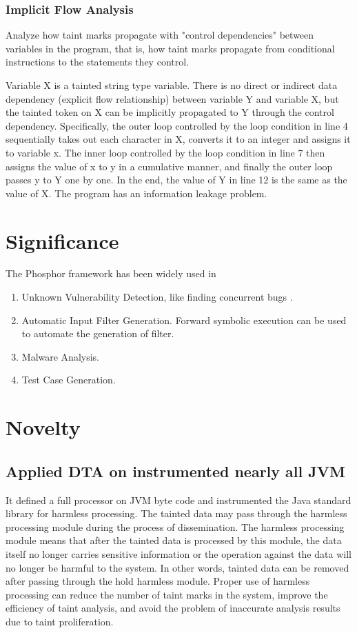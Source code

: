 \documentclass[conference]{IEEEtran}
\begin{document}
\subsubsection{Implicit Flow Analysis}
Analyze how taint marks propagate with "control dependencies" between variables in the program, that is, how taint marks propagate from conditional instructions to the statements they control.

Variable X is a tainted string type variable. There is no direct or indirect data dependency (explicit flow relationship) between variable Y and variable X, but the tainted token on X can be implicitly propagated to Y through the control dependency.
Specifically, the outer loop controlled by the loop condition in line 4 sequentially takes out each character in X, converts it to an integer and assigns it to variable x. The inner loop controlled by the loop condition in line 7 then assigns the value of x to y in a cumulative manner, and finally the outer loop passes y to Y one by one.
In the end, the value of Y in line 12 is the same as the value of X. The program has an information leakage problem.
\section{Significance}
The Phosphor framework has been widely used in \cite{b11}
\begin{enumerate}
 \item Unknown Vulnerability Detection, like finding concurrent bugs \cite{b10}.
 \item Automatic Input Filter Generation. Forward symbolic execution can be used to automate the generation of filter.
 \item Malware Analysis.
 \item Test Case Generation.
 \end{enumerate}

\section{Novelty}
\subsection{Applied DTA on instrumented nearly all JVM}
It defined a full processor on JVM byte code and instrumented the Java standard library for harmless processing. The tainted data may pass through the harmless processing module during the process of dissemination. The harmless processing module means that after the tainted data is processed by this module, the data itself no longer carries sensitive information or the operation against the data will no longer be harmful to the system. In other words, tainted data can be removed after passing through the hold harmless module.
Proper use of harmless processing can reduce the number of taint marks in the system, improve the efficiency of taint analysis, and avoid the problem of inaccurate analysis results due to taint proliferation.
\end{document}

